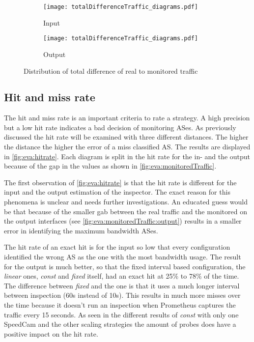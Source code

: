 \documentclass[thesis.tex]{subfiles}
\begin{document}
\begin{figure}[h]
	\centering
	\begin{subfigure}{.8\linewidth}
		\centering
		\texttt{[image: totalDifferenceTraffic\_diagrams.pdf]}
		\caption{Input}
		\label{fig:eva:precisionTotal:input}
	\end{subfigure}
	\begin{subfigure}{0.8\linewidth}
		\centering
		\texttt{[image: totalDifferenceTraffic\_diagrams.pdf]}
		\caption{Output}
		\label{fig:eva:precisionTotal:output}
	\end{subfigure}
	\caption{Distribution of total difference of real to monitored traffic}
	\label{fig:eva:precisionTotal}
\end{figure}


\subsection{Hit and miss rate} \label{sec:eva:hitrate}
The hit and miss rate is an important criteria to rate a strategy. A high precision but a low hit rate indicates a bad decision of monitoring ASes. As previously discussed the hit rate will be examined with three different distances. The higher the distance the higher the error of a miss classified AS. The results are displayed in \autoref{fig:eva:hitrate}. Each diagram is split in the hit rate for the in- and the output because of the gap in the values as shown in \autoref{fig:eva:monitoredTraffic}.

The first observation of \autoref{fig:eva:hitrate} is that the hit rate is different for the input and the output estimation of the inspector. The exact reason for this phenomena is unclear and needs further investigations. An educated guess would be that because of the smaller gab between the real traffic and the monitored on the output interfaces (see \autoref{fig:eva:monitoredTraffic:output}) results in a smaller error in identifying the maximum bandwidth ASes.

The hit rate of an exact hit is for the input so low that every configuration identified the wrong AS as the one with the most bandwidth usage. The result for the output is much better, so that the fixed interval based configuration, the \textit{linear} ones, \textit{const} and \textit{fixed} itself, had an exact hit at 25\% to 78\% of the time. The difference between \textit{fixed} and the one is that it uses a much longer interval between inspection (60s instead of 10s). This results in much more misses over the time because it doesn't run an inspection when Prometheus captures the traffic every 15 seconds. As seen in the different results of \textit{const} with only one SpeedCam and the other scaling strategies the amount of probes does have a positive impact on the hit rate. 
\end{document}
